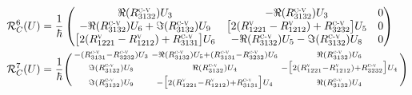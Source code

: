 \documentclass[a4paper,12pt]{article} %
\begin{document}
\begin{eqnarray*}
\begin{split}
\mathcal{R}^{6}_{C}(U)&= \dfrac{1}{\hbar}
\begin{pmatrix}
\Re(R^{\textsc{c-v}}_{3132})U_{3} & -\Re(R^{\textsc{c-v}}_{3132})U_{3} & 0 \\
-\Re(R^{\textsc{c-v}}_{3132})U_{6}+\Im(R^{\textsc{c-v}}_{3132})U_{9} & \big[2(R^{\textsc{v}}_{1221}-R^{\textsc{v}}_{1212})+R^{\textsc{c-v}}_{3232}\big]U_{5} & 0 \\
\big[2(R^{\textsc{v}}_{1221}-R^{\textsc{v}}_{1212})+R^{\textsc{c-v}}_{3131}\big]U_{6} & -\Re(R^{\textsc{c-v}}_{3132})U_{5}- \Im(R^{\textsc{c-v}}_{3132})U_{8} & 0 
\end{pmatrix}\\
\mathcal{R}^{7}_{C}(U)&= \dfrac{1}{\hbar}
\Bigg(\begin{smallmatrix}
-(R^{\textsc{c-v}}_{3131}-R^{\textsc{c-v}}_{3232})U_{3} & -\Re(R^{\textsc{c-v}}_{3132})U_{5}
 +(R^{\textsc{c-v}}_{3131}-R^{\textsc{c-v}}_{3232})U_{6} &  \Re(R^{\textsc{c-v}}_{3132})U_{6}\\
\Im(R^{\textsc{c-v}}_{3132})U_{8} & \Re(R^{\textsc{c-v}}_{3132})U_{4} & -\big[2(R^{\textsc{v}}_{1221}-R^{\textsc{v}}_{1212})+R^{\textsc{c-v}}_{3232}\big]U_{4}\\
\Im(R^{\textsc{c-v}}_{3132})U_{9} & -\big[2(R^{\textsc{v}}_{1221}-R^{\textsc{v}}_{1212})+R^{\textsc{c-v}}_{3131}\big]U_{4} & \Re(R^{\textsc{c-v}}_{3132})U_{4} 
\end{smallmatrix}\Bigg)
\end{split}
\end{eqnarray*}
\end{document}
